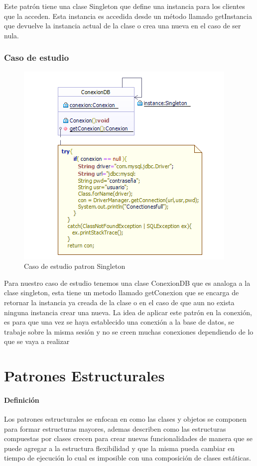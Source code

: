 Este patrón tiene una clase Singleton que define una instancia para los clientes que la acceden. Esta instancia es accedida desde un método llamado getInstancia que devuelve la instancia actual de la clase o crea una nueva en el caso de ser nula.

\newpage
\subsubsection{Caso de estudio}
\begin{figure}[h!]
	\centering
	\includegraphics[width=0.7\linewidth]{arquitectura/imagenes/PatronSingeltonCasoEstudio}
	\caption{Caso de estudio patron Singleton}
\end{figure}

Para nuestro caso de estudio tenemos una clase ConexionDB que es analoga a la clase singleton, esta tiene un metodo llamado getConexion que se encarga de retornar la instancia ya creada de la clase o en el caso de que aun no exista ninguna instancia crear una nueva.\newline
La idea de  aplicar este patrón en la conexión, es para que una vez se haya establecido una conexión a la base de datos, se trabaje sobre la misma sesión y no se creen muchas conexiones dependiendo de lo que se vaya a realizar  

\newpage

\section{Patrones Estructurales}
\paragraph{Definición}
Los patrones estructurales se enfocan en como las clases y objetos se componen para formar estructuras mayores, ademas describen como las estructuras compuestas por clases crecen para crear nuevas funcionalidades de manera que se puede agregar a la estructura flexibilidad y que la misma pueda cambiar en tiempo de ejecución lo cual es imposible con una composición de clases estáticas.
